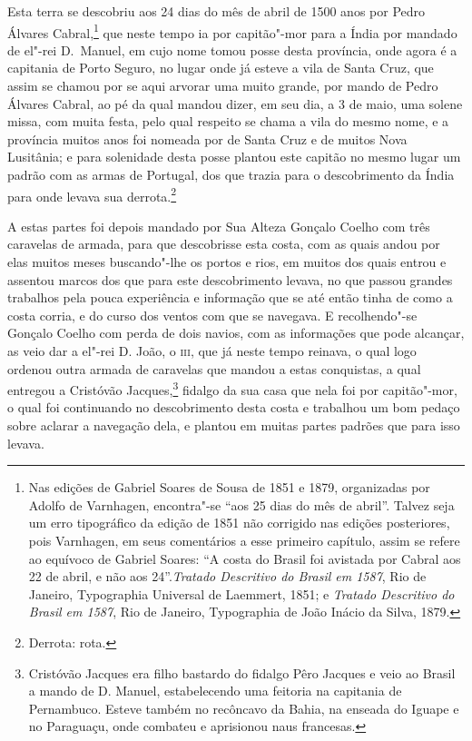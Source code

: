 Esta terra se descobriu aos 24 dias do mês de abril de 1500 anos por Pedro Álvares
Cabral,\footnote{ Nas edições de Gabriel Soares de Sousa de 1851 e 1879, organizadas por
Adolfo de Varnhagen, encontra"-se ``aos 25 dias do mês de abril''. Talvez seja um erro
tipográfico da edição de 1851 não corrigido nas edições posteriores, pois Varnhagen, em
seus comentários a esse primeiro capítulo, assim se refere ao equívoco de Gabriel Soares:
``A costa do Brasil foi avistada por Cabral aos 22 de abril, e não aos
24''.\textit{Tratado Descritivo do Brasil em 1587}, Rio de Janeiro, Typographia Universal
de Laemmert, 1851; e \textit{Tratado Descritivo do Brasil em 1587}, Rio de Janeiro,
Typographia de João Inácio da Silva, 1879.}
que neste tempo ia por capitão"-mor para a Índia por mandado de el"-rei D.~Manuel, em cujo
nome tomou posse desta província, onde agora é a capitania de Porto Seguro, no lugar onde
já esteve a vila de Santa Cruz, que assim se chamou por se aqui arvorar uma muito grande,
por mando de Pedro Álvares Cabral, ao pé da qual mandou dizer, em seu dia, a 3 de maio,
uma solene missa, com muita festa, pelo qual respeito se chama a vila do mesmo nome, e a
província muitos anos foi nomeada por de Santa Cruz e de muitos Nova Lusitânia; e para
solenidade desta posse plantou este capitão no mesmo lugar um padrão com as armas de
Portugal, dos que trazia para o descobrimento da Índia para onde levava sua derrota.\footnote{
Derrota: rota.}

A estas partes foi depois mandado por Sua Alteza Gonçalo Coelho com três caravelas de
armada, para que descobrisse esta costa, com as quais andou por elas muitos meses
buscando"-lhe os portos e rios, em muitos dos quais entrou e assentou marcos dos que para
este descobrimento levava, no que passou grandes trabalhos pela pouca experiência e
informação que se até então tinha de como a costa corria, e do curso dos ventos com que se
navegava. E recolhendo"-se Gonçalo Coelho com perda de dois navios, com as informações que
pode alcançar, as veio dar a el"-rei D. João, o \textsc{iii}, que já neste tempo reinava, o
qual logo ordenou outra armada de caravelas que mandou a estas conquistas, a qual entregou
a Cristóvão Jacques,\footnote{ Cristóvão Jacques era filho bastardo do fidalgo Pêro
Jacques e veio ao Brasil a mando de D. Manuel, estabelecendo uma feitoria na capitania de
Pernambuco. Esteve também no recôncavo da Bahia, na enseada do Iguape e no Paraguaçu, onde
combateu e aprisionou naus francesas.} fidalgo da sua casa que nela foi por capitão"-mor, o
qual foi continuando no descobrimento desta costa e trabalhou um bom pedaço sobre aclarar
a navegação dela, e plantou em muitas partes padrões que para isso levava.

